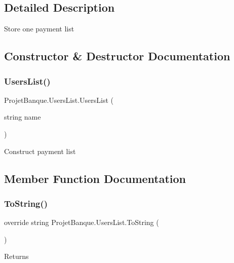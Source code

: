 \subsection{Detailed Description}
Store one payment list 



\subsection{Constructor \& Destructor Documentation}
\mbox{\label{class_projet_banque_1_1_users_list_ac4e2ed2432841628f77f4a9a437714ef}} 
\subsubsection{\texorpdfstring{UsersList()}{UsersList()}}
{\footnotesize\ttfamily Projet\+Banque.\+Users\+List.\+Users\+List (\begin{DoxyParamCaption}\item[{string}]{name }\end{DoxyParamCaption})}



Construct payment list 



\subsection{Member Function Documentation}
\mbox{\label{class_projet_banque_1_1_users_list_ab718952e4885cf0331159b2469d38d7f}} 
\subsubsection{\texorpdfstring{ToString()}{ToString()}}
{\footnotesize\ttfamily override string Projet\+Banque.\+Users\+List.\+To\+String (\begin{DoxyParamCaption}{ }\end{DoxyParamCaption})}





\begin{DoxyReturn}{Returns}

\end{DoxyReturn}


